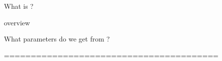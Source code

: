 \begin{subsection}{What is \pointer?}

overview

\end{subsection}
\begin{subsection}{What parameters do we get from \pointer?}



\newcommand{\bij}{\textcolor{black}{B_{ij}}}
\newcommand{\bijr}{\bij r}
\newcommand{\vmultipolecolor}{\ensuremath{\sum\limits_{tu}\textcolor{mon}{Q_t^i}T_{tu}\textcolor{mon}{Q_u^j}}\xspace}
%

\end{subsection}

========================================



